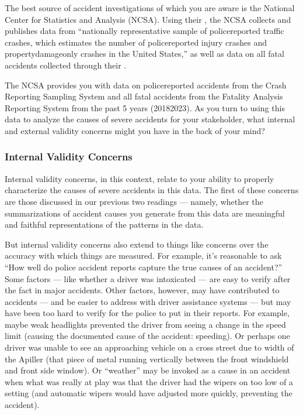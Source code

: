 \documentclass[letterpaper,10pt,english]{jupyterBook}
\begin{document}
\sphinxAtStartPar
The best source of accident investigations of which you are aware is the  National Center for Statistics and Analysis (NCSA). Using their , the NCSA collects and publishes data from “nationally representative sample of police\sphinxhyphen{}reported traffic crashes, which estimates the number of police\sphinxhyphen{}reported injury crashes and property\sphinxhyphen{}damage\sphinxhyphen{}only crashes in the United States,” as well as data on all fatal accidents collected through their .

\sphinxAtStartPar
The NCSA provides you with data on police\sphinxhyphen{}reported accidents from the Crash Reporting Sampling System and all fatal accidents from the Fatality Analysis Reporting System from the past 5 years (2018\sphinxhyphen{}2023). As you turn to using this data to analyze the causes of severe accidents for your stakeholder, what internal and external validity concerns might you have in the back of your mind?


\subsubsection{Internal Validity Concerns}
\label{\detokenize{30_questions/17_exploratory_questions_internal_external:internal-validity-concerns}}
\sphinxAtStartPar
Internal validity concerns, in this context, relate to your ability to properly characterize the causes of severe accidents in this data. The first of these concerns are those discussed in our previous two readings — namely, whether the summarizations of accident causes you generate from this data are meaningful and faithful representations of the patterns in the data.

\sphinxAtStartPar
But internal validity concerns also extend to things like concerns over the accuracy with which things are measured. For example, it’s reasonable to ask “How well do police accident reports capture the true causes of an accident?” Some factors — like whether a driver was intoxicated — are easy to verify after the fact in major accidents. Other factors, however, may have contributed to accidents — and be easier to address with driver assistance systems — but may have been too hard to verify for the police to put in their reports. For example, maybe weak headlights prevented the driver from seeing a change in the speed limit (causing the documented cause of the accident: speeding). Or perhaps one driver was unable to see an approaching vehicle on a cross street due to width of the A\sphinxhyphen{}piller (that piece of metal running vertically between the front windshield and front side window). Or “weather” may be invoked as a cause in an accident when what was really at play was that the driver had the wipers on too low of a setting (and automatic wipers would have adjusted more quickly, preventing the accident).
\end{document}
